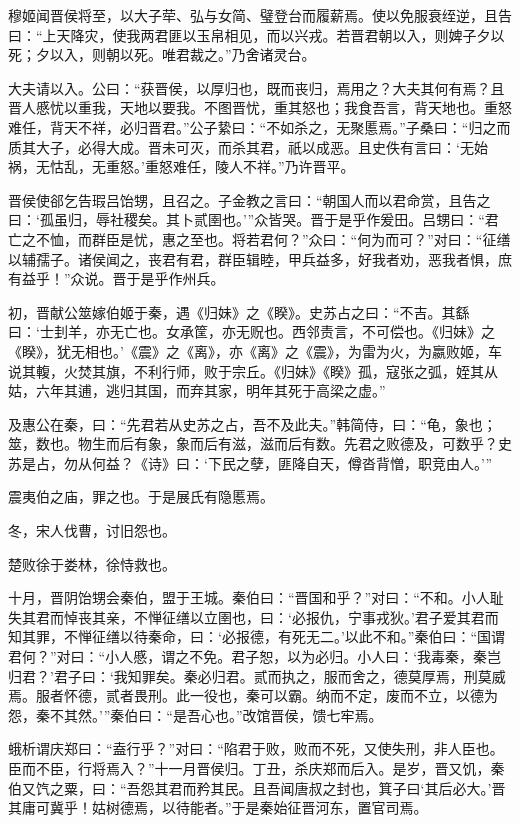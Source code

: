 \documentclass[a4paper,12pt,UTF8,twoside]{ctexbook}
\begin{document}
穆姬闻晋侯将至，以大子荦、弘与女简、璧登台而履薪焉。使以免服衰绖逆，且告曰：“上天降灾，使我两君匪以玉帛相见，而以兴戎。若晋君朝以入，则婢子夕以死；夕以入，则朝以死。唯君裁之。”乃舍诸灵台。

大夫请以入。公曰：“获晋侯，以厚归也，既而丧归，焉用之？大夫其何有焉？且晋人慼忧以重我，天地以要我。不图晋忧，重其怒也；我食吾言，背天地也。重怒难任，背天不祥，必归晋君。”公子絷曰：“不如杀之，无聚慝焉。”子桑曰：“归之而质其大子，必得大成。晋未可灭，而杀其君，祇以成恶。且史佚有言曰：‘无始祸，无怙乱，无重怒。’重怒难任，陵人不祥。”乃许晋平。

晋侯使郤乞告瑕吕饴甥，且召之。子金教之言曰：“朝国人而以君命赏，且告之曰：‘孤虽归，辱社稷矣。其卜贰圉也。’”众皆哭。晋于是乎作爰田。吕甥曰：“君亡之不恤，而群臣是忧，惠之至也。将若君何？”众曰：“何为而可？”对曰：“征缮以辅孺子。诸侯闻之，丧君有君，群臣辑睦，甲兵益多，好我者劝，恶我者惧，庶有益乎！”众说。晋于是乎作州兵。

初，晋献公筮嫁伯姬于秦，遇《归妹》之《睽》。史苏占之曰：“不吉。其繇曰：‘士刲羊，亦无亡也。女承筐，亦无贶也。西邻责言，不可偿也。《归妹》之《睽》，犹无相也。’《震》之《离》，亦《离》之《震》，为雷为火，为嬴败姬，车说其輹，火焚其旗，不利行师，败于宗丘。《归妹》《睽》孤，寇张之弧，姪其从姑，六年其逋，逃归其国，而弃其家，明年其死于高梁之虚。”

及惠公在秦，曰：“先君若从史苏之占，吾不及此夫。”韩简侍，曰：“龟，象也；筮，数也。物生而后有象，象而后有滋，滋而后有数。先君之败德及，可数乎？史苏是占，勿从何益？《诗》曰：‘下民之孽，匪降自天，僔沓背憎，职竞由人。’”

震夷伯之庙，罪之也。于是展氏有隐慝焉。

冬，宋人伐曹，讨旧怨也。

楚败徐于娄林，徐恃救也。

十月，晋阴饴甥会秦伯，盟于王城。秦伯曰：“晋国和乎？”对曰：“不和。小人耻失其君而悼丧其亲，不惮征缮以立圉也，曰：‘必报仇，宁事戎狄。’君子爱其君而知其罪，不惮征缮以待秦命，曰：‘必报德，有死无二。’以此不和。”秦伯曰：“国谓君何？”对曰：“小人慼，谓之不免。君子恕，以为必归。小人曰：‘我毒秦，秦岂归君？’君子曰：‘我知罪矣。秦必归君。贰而执之，服而舍之，德莫厚焉，刑莫威焉。服者怀德，贰者畏刑。此一役也，秦可以霸。纳而不定，废而不立，以德为怨，秦不其然。’”秦伯曰：“是吾心也。”改馆晋侯，馈七牢焉。

蛾析谓庆郑曰：“盍行乎？”对曰：“陷君于败，败而不死，又使失刑，非人臣也。臣而不臣，行将焉入？”十一月晋侯归。丁丑，杀庆郑而后入。是岁，晋又饥，秦伯又饩之粟，曰：“吾怨其君而矜其民。且吾闻唐叔之封也，箕子曰‘其后必大。’晋其庸可冀乎！姑树德焉，以待能者。”于是秦始征晋河东，置官司焉。
\end{document}
